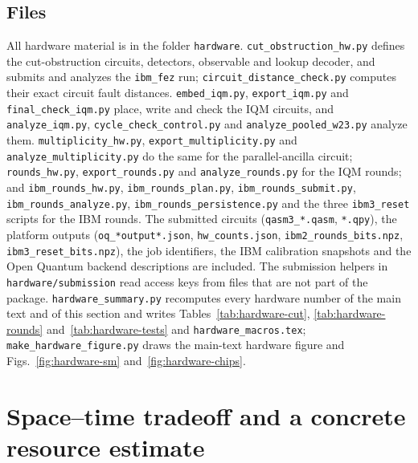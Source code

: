 \documentclass[aps,prx,reprint,superscriptaddress,nofootinbib,floatfix,longbibliography]{revtex4-2}
\theoremstyle{definition}
\begin{document}
\subsection{Files}
All hardware material is in the folder \texttt{hardware}.
\texttt{cut\_obstruction\_hw.py} defines the cut-obstruction circuits,
detectors, observable and lookup decoder, and submits and analyzes the
\texttt{ibm\_fez} run; \texttt{circuit\_distance\_check.py} computes their
exact circuit fault distances.  \texttt{embed\_iqm.py},
\texttt{export\_iqm.py} and \texttt{final\_check\_iqm.py} place, write and
check the IQM circuits, and \texttt{analyze\_iqm.py},
\texttt{cycle\_check\_control.py} and \texttt{analyze\_pooled\_w23.py} analyze
them.  \texttt{multiplicity\_hw.py}, \texttt{export\_multiplicity.py} and
\texttt{analyze\_multiplicity.py} do the same for the parallel-ancilla
circuit; \texttt{rounds\_hw.py}, \texttt{export\_rounds.py} and
\texttt{analyze\_rounds.py} for the IQM rounds; and
\texttt{ibm\_rounds\_hw.py}, \texttt{ibm\_rounds\_plan.py},
\texttt{ibm\_rounds\_submit.py}, \texttt{ibm\_rounds\_analyze.py},
\texttt{ibm\_rounds\_persistence.py} and the three \texttt{ibm3\_reset}
scripts for the IBM rounds.  The submitted circuits (\texttt{qasm3\_*.qasm},
\texttt{*.qpy}), the platform outputs (\texttt{oq\_*output*.json},
\texttt{hw\_counts.json}, \texttt{ibm2\_rounds\_bits.npz},
\texttt{ibm3\_reset\_bits.npz}), the job identifiers, the IBM calibration
snapshots and the Open Quantum backend descriptions are included.  The
submission helpers in \texttt{hardware/submission} read access keys from
files that are not part of the package.  \texttt{hardware\_summary.py}
recomputes every hardware number of the main text and of this section and
writes Tables~\ref{tab:hardware-cut}, \ref{tab:hardware-rounds}
and~\ref{tab:hardware-tests} and \texttt{hardware\_macros.tex};
\texttt{make\_hardware\_figure.py} draws the main-text hardware figure and
Figs.~\ref{fig:hardware-sm} and~\ref{fig:hardware-chips}.

\section{Space--time tradeoff and a concrete resource estimate}
\label{sec:resource-estimate}
\end{document}
